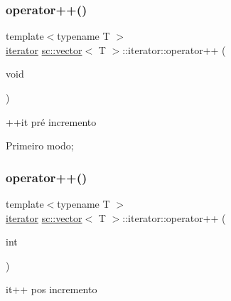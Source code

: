 \subsubsection{\texorpdfstring{operator++()}{operator++()}\hspace{0.1cm}{\footnotesize\ttfamily [1/2]}}
{\footnotesize\ttfamily template$<$typename T $>$ \\
\hyperlink{classsc_1_1vector_1_1iterator}{iterator} \hyperlink{classsc_1_1vector}{sc\+::vector}$<$ T $>$\+::iterator\+::operator++ (\begin{DoxyParamCaption}\item[{void}]{ }\end{DoxyParamCaption})\hspace{0.3cm}{\ttfamily [inline]}}



++it pré incremento 

Primeiro modo; \mbox{\label{classsc_1_1vector_1_1iterator_a7e58b618eb71b340b74311eda1271bc9}} 
\subsubsection{\texorpdfstring{operator++()}{operator++()}\hspace{0.1cm}{\footnotesize\ttfamily [2/2]}}
{\footnotesize\ttfamily template$<$typename T $>$ \\
\hyperlink{classsc_1_1vector_1_1iterator}{iterator} \hyperlink{classsc_1_1vector}{sc\+::vector}$<$ T $>$\+::iterator\+::operator++ (\begin{DoxyParamCaption}\item[{int}]{ }\end{DoxyParamCaption})\hspace{0.3cm}{\ttfamily [inline]}}



it++ pos incremento 

\mbox{\label{classsc_1_1vector_1_1iterator_a8be1d69a3f7f0d220487463a60a5efd4}} 
